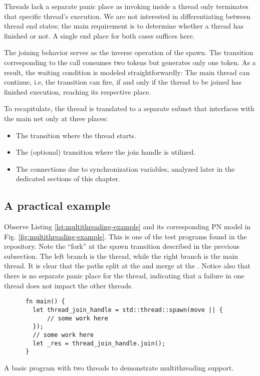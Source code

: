 Threads lack a separate panic place
as invoking  inside a thread
only terminates that specific thread's execution.
We are not interested in differentiating between thread end states;
the main requirement is to determine whether a thread has finished or not.
A single end place for both cases suffices here.

The joining behavior serves as the inverse operation of the spawn.
The transition corresponding to the  call consumes two tokens
but generates only one token.
As a result, the waiting condition is modeled straightforwardly:
The main thread can continue, i.e, the  transition can fire,
if and only if the thread to be joined has finished execution,
reaching its respective  place.

To recapitulate, the thread is translated to a separate subnet
that interfaces with the main net only at three places:

\begin{itemize}
      \item The  transition where the thread starts.
      \item The (optional)  transition where the join handle is utilized.
      \item The connections due to synchronization variables,
            analyzed later in the dedicated sections of this chapter.
\end{itemize}

\subsection{A practical example}

Observe Listing \ref{lst:multithreading-example}
and its corresponding \acrshort{PN} model in Fig. \ref{fig:multithreading-example}.
This is one of the test programs found in the repository.
Note the ``fork'' at the spawn transition described in the previous subsection.
The left branch is the thread, while the right branch is the main thread.
It is clear that the paths split at the  and merge
at the .
Notice also that there is no separate panic place for the thread,
indicating that a failure in one thread does not impact the other threads.

\begin{listing}[!htb]
      \begin{verbatim}
      fn main() {
        let thread_join_handle = std::thread::spawn(move || {
            // some work here
        });
        // some work here
        let _res = thread_join_handle.join();
      }  
      \end{verbatim}
      \caption{A basic program with two threads to demonstrate multithreading support.}
      \label{lst:multithreading-example}
\end{listing}

